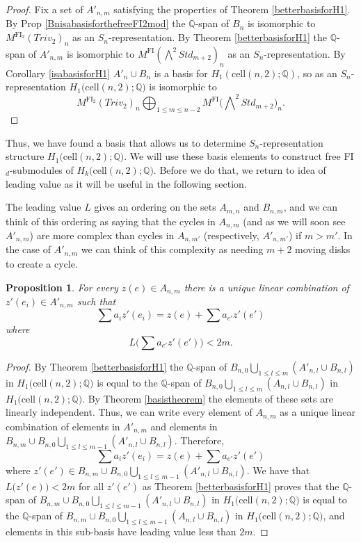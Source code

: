 \documentclass[12py]{amsart}%
\newtheorem{prop}[thm]{Proposition}
\theoremstyle{definition}\newtheorem{definition}[thm]{Definition}
\theoremstyle{definition}
\newcommand{\Q}{\ensuremath{\mathbb{Q}}}
\begin{document}
\begin{proof}
Fix a set of $A'_{n,m}$ satisfying the properties of Theorem \ref{betterbasisforH1}. By Prop \ref{BnisabasisforthefreeFI2mod} the $\Q$-span of $B_{n}$ is isomorphic to $M^{\text{FI}_{2}}(Triv_{2})_{n}$ as an $S_{n}$-representation. By Theorem \ref{betterbasisforH1} the $\Q$-span of $A'_{n,m}$ is isomorphic to $M^{\text{FI}}(\bigwedge^{2}Std_{m+2})_{n}$ as an $S_{n}$-representation. By Corollary \ref{isabasisforH1} $A'_{n}\cup B_{n}$ is a basis for $H_{1}(\text{cell}(n,2);\Q)$, so as an $S_{n}$-representation $H_{1}\big(\text{cell}(n,2);\Q\big)$ is isomorphic to
\[
M^{\text{FI}_{2}}(Triv_{2})_{n}\bigoplus_{1\le m\le n-2}M^{\text{FI}}\Big(\bigwedge\nolimits^{2}Std_{m+2}\Big)_{n}.
\]
\end{proof}

Thus, we have found a basis that allows us to determine $S_{n}$-representation structure $H_{1}\big(\text{cell}(n,2);\Q\big)$. We will use these basis elements to construct free FI$_{d}$-submodules of $H_{k}\big(\text{cell}(n,2);\Q\big)$. Before we do that, we return to idea of leading value as it will be useful in the following section.

The leading value $L$ gives an ordering on the sets $A_{m,n}$ and $B_{n,m}$, and we can think of this ordering as saying that the cycles in $A_{n,m}$ (and as we will soon see $A'_{n,m}$) are more complex than cycles in $A_{n,m'}$ (respectively, $A'_{n,m'}$) if $m>m'$. In the case of $A'_{n,m}$ we can think of this complexity as needing $m+2$ moving disks to create a cycle.

\begin{prop}\label{Lfunction}
For every $z(e)\in A_{n,m}$ there is a unique linear combination of $z'(e_{i})\in A'_{n,m}$ such that
\[
\sum a_{i}z'(e_{i})=z(e)+\sum a_{e'}z'(e')
\]
where
\[
L\Big(\sum a_{e'}z'(e')\Big)<2m.
\]
\end{prop}

\begin{proof}
By Theorem \ref{betterbasisforH1} the $\Q$-span of $B_{n,0}\bigcup_{1\le l\le m}(A'_{n, l}\cup B_{n,l})$ in $H_{1}\big(\text{cell}(n,2);\Q\big)$ is equal to the $\Q$-span of $B_{n,0}\bigcup_{1\le l\le m}(A_{n, l}\cup B_{n,l})$ in $H_{1}\big(\text{cell}(n,2);\Q\big)$. By Theorem \ref{basistheorem} the elements of these sets are linearly independent. Thus, we can write every element of $A_{n,m}$ as a unique linear combination of elements in $A'_{n,m}$ and elements in $B_{n,m}\cup B_{n,0}\bigcup_{1\le l\le m-1}(A'_{n, l}\cup B_{n,l})$. Therefore, 
\[
\sum a_{i}z'(e_{i})=z(e)+\sum a_{e'}z'(e')
\]
where $z'(e')\in B_{n,m}\cup B_{n,0}\bigcup_{1\le l\le m-1}(A'_{n, l}\cup B_{n,l})$. We have that $L\big(z'(e)\big)<2m$ for all $z'(e')$ as Theorem \ref{betterbasisforH1} proves that the $\Q$-span of $B_{n,m}\cup B_{n,0}\bigcup_{1\le l\le m-1}(A'_{n, l}\cup B_{n,l})$ in $H_{1}\big(\text{cell}(n,2);\Q\big)$  is equal to the $\Q$-span of $B_{n,m}\cup B_{n,0}\bigcup_{1\le l\le m-1}(A_{n, l}\cup B_{n,l})$ in $H_{1}\big(\text{cell}(n,2);\Q\big)$, and elements in this sub-basis have leading value less than $2m$.
\end{proof}
\end{document}
